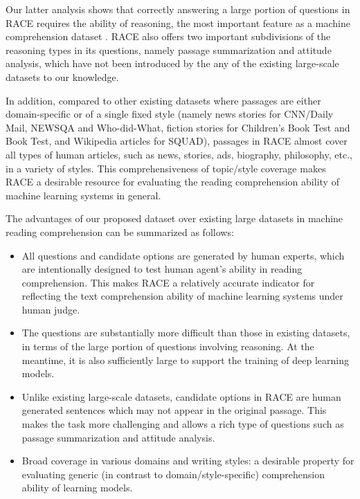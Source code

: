 Our latter analysis shows that correctly answering a large portion of questions in RACE requires the ability of reasoning, the most important feature as a machine comprehension dataset \cite{chen2016thorough}. RACE also offers two important subdivisions of the reasoning types in its questions, namely passage summarization and attitude analysis, which have not been introduced by the any of the existing large-scale datasets to our knowledge. 

In addition, compared to other existing datasets where passages are either domain-specific or of a single fixed style (namely news stories for CNN/Daily Mail, NEWSQA and Who-did-What, fiction stories for Children's Book Test and Book Test, and Wikipedia articles for SQUAD), passages in RACE almost cover all types of human articles, such as news, stories, ads, biography, philosophy, etc., in a variety of styles. This comprehensiveness of topic/style coverage makes RACE a desirable resource for evaluating the reading comprehension ability of machine learning systems in general. 

The advantages of our proposed dataset over existing large datasets in machine reading comprehension can be summarized as follows:

\begin{itemize}
    \item All questions and candidate options are generated by human experts, which are intentionally designed to test human agent's ability in reading comprehension. This makes RACE a relatively accurate indicator for reflecting the text comprehension ability of machine learning systems under human judge. 

    \item The questions are substantially more difficult than those in existing datasets, in terms of the large portion of questions involving reasoning. At the meantime, it is also sufficiently large to support the training of deep learning models.

    \item Unlike existing large-scale datasets, candidate options in RACE are human generated sentences which may not appear in the original passage. This makes the task more challenging and allows a rich type of questions such as passage summarization and attitude analysis.

    \item Broad coverage in various domains and writing styles: a desirable property for evaluating generic (in contrast to domain/style-specific) comprehension ability of learning models. 

\end{itemize}

